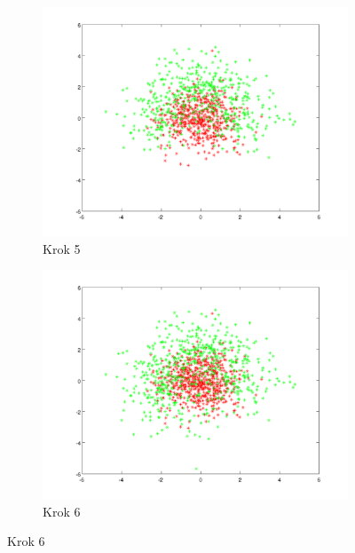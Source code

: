 \documentclass[10pt,a4paper]{article}
\begin{document}
\begin{figure}[h]
  \begin{subfigure}[b]{0.4\textwidth}
    \includegraphics[width=\textwidth]{dataGen_step4.png}
    \caption{Krok 5}
  \end{subfigure}
  \hfill
  \begin{subfigure}[b]{0.4\textwidth}
    \includegraphics[width=\textwidth]{dataGen_step5.png}
    \caption{Krok 6}
  \end{subfigure}
  

\end{figure}
\end{document}
